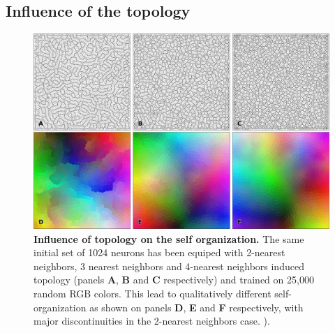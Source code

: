 \subsection{Influence of the topology}

\begin{figure}
  \includegraphics[width=\columnwidth]{figure-topology-influence.pdf}
  \caption{%
  \textbf{Influence of topology on the self organization.}
  The same initial set of 1024 neurons has been equiped with 2-nearest neighbors, 3 nearest neighbors and 4-nearest neighbors induced topology (panels \textbf{A}, \textbf{B} and \textbf{C} respectively) and trained on 25,000 random RGB colors. This lead to qualitatively different self-organization as shown on panels \textbf{D}, \textbf{E} and \textbf{F} respectively, with major discontinuities in the 2-nearest neighbors case. ).
  }
  \label{fig:topology-influence}

\end{figure}
